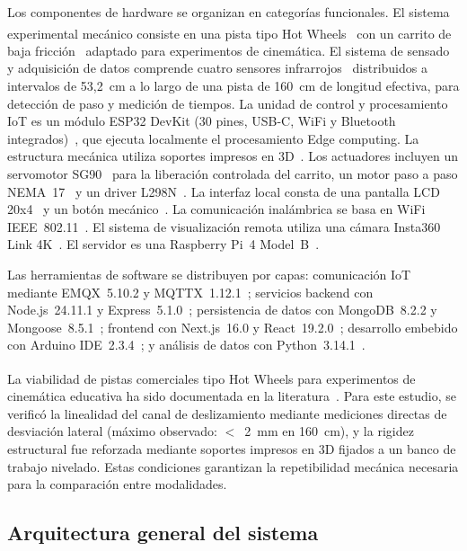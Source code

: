 \documentclass{espol-rte}
\begin{document}
Los componentes de hardware se organizan en categor\'ias funcionales. El sistema experimental mec\'anico consiste en una pista tipo Hot Wheels\textsuperscript{\textregistered}~\parencite{r18} con un carrito de baja fricci\'on~\parencite{r19} adaptado para experimentos de cinem\'atica. El sistema de sensado y adquisici\'on de datos comprende cuatro sensores infrarrojos~\parencite{r20} distribuidos a intervalos de 53{,}2~cm a lo largo de una pista de 160~cm de longitud efectiva, para detecci\'on de paso y medici\'on de tiempos. La unidad de control y procesamiento IoT es un m\'odulo ESP32 DevKit (30 pines, USB-C, WiFi y Bluetooth integrados)~\parencite{r21,r53}, que ejecuta localmente el procesamiento Edge computing. La estructura mec\'anica utiliza soportes impresos en 3D~\parencite{r22,r23,r24,r25}. Los actuadores incluyen un servomotor SG90~\parencite{r26} para la liberaci\'on controlada del carrito, un motor paso a paso NEMA~17~\parencite{r27} y un driver L298N~\parencite{r28}. La interfaz local consta de una pantalla LCD 20x4~\parencite{r29} y un bot\'on mec\'anico~\parencite{r30}. La comunicaci\'on inal\'ambrica se basa en WiFi IEEE~802.11~\parencite{r31,r32}. El sistema de visualizaci\'on remota utiliza una c\'amara Insta360 Link 4K~\parencite{r36}. El servidor es una Raspberry Pi~4 Model~B~\parencite{r37}.

Las herramientas de software se distribuyen por capas: comunicaci\'on IoT mediante EMQX~5.10.2 y MQTTX~1.12.1~\parencite{r38,r39}; servicios backend con Node.js~24.11.1 y Express~5.1.0~\parencite{r40,r41}; persistencia de datos con MongoDB~8.2.2 y Mongoose~8.5.1~\parencite{r42,r43}; frontend con Next.js~16.0 y React~19.2.0~\parencite{r44,r45}; desarrollo embebido con Arduino IDE~2.3.4~\parencite{r46}; y an\'alisis de datos con Python~3.14.1~\parencite{r47}.

La viabilidad de pistas comerciales tipo Hot Wheels\textsuperscript{\textregistered} para experimentos de cinem\'atica educativa ha sido documentada en la literatura~\parencite{r18}. Para este estudio, se verific\'o la linealidad del canal de deslizamiento mediante mediciones directas de desviaci\'on lateral (m\'aximo observado: $<$~2~mm en 160~cm), y la rigidez estructural fue reforzada mediante soportes impresos en 3D fijados a un banco de trabajo nivelado. Estas condiciones garantizan la repetibilidad mec\'anica necesaria para la comparaci\'on entre modalidades.

\subsection{Arquitectura general del sistema}
\end{document}
